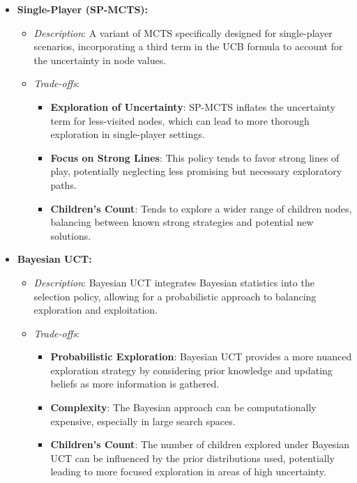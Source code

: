 \begin{itemize}
    \item \textbf{Single-Player (SP-MCTS):}
          \begin{itemize}
              \item \textit{Description}: A variant of MCTS specifically designed for single-player scenarios, incorporating a third term in the UCB formula to account for the uncertainty in node values.
              \item \textit{Trade-offs}:
                    \begin{itemize}
                        \item \textbf{Exploration of Uncertainty}: SP-MCTS inflates the uncertainty term for less-visited nodes, which can lead to more thorough exploration in single-player settings.
                        \item \textbf{Focus on Strong Lines}: This policy tends to favor strong lines of play, potentially neglecting less promising but necessary exploratory paths.
                        \item \textbf{Children's Count}: Tends to explore a wider range of children nodes, balancing between known strong strategies and potential new solutions.
                    \end{itemize}
          \end{itemize}

    \item \textbf{Bayesian UCT:}
          \begin{itemize}
              \item \textit{Description}: Bayesian UCT integrates Bayesian statistics into the selection policy, allowing for a probabilistic approach to balancing exploration and exploitation.
              \item \textit{Trade-offs}:
                    \begin{itemize}
                        \item \textbf{Probabilistic Exploration}: Bayesian UCT provides a more nuanced exploration strategy by considering prior knowledge and updating beliefs as more information is gathered.
                        \item \textbf{Complexity}: The Bayesian approach can be computationally expensive, especially in large search spaces.
                        \item \textbf{Children's Count}: The number of children explored under Bayesian UCT can be influenced by the prior distributions used, potentially leading to more focused exploration in areas of high uncertainty.
                    \end{itemize}
          \end{itemize}
\end{itemize}

